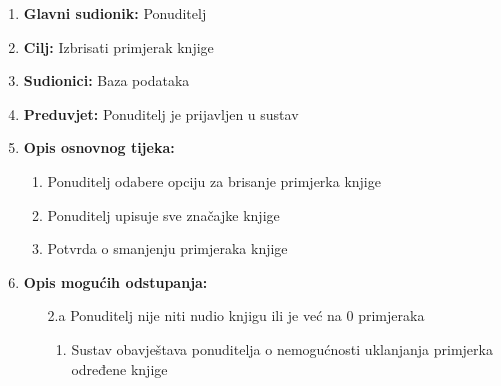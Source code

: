 \documentclass[12pt]{report}
\begin{document}
\noindent {}
\begin{enumerate}
	
	\item \textbf{Glavni sudionik: } Ponuditelj
	\item  \textbf{Cilj:} Izbrisati primjerak knjige
	\item  \textbf{Sudionici:} Baza podataka
	\item  \textbf{Preduvjet:} Ponuditelj je prijavljen u sustav
	\item  \textbf{Opis osnovnog tijeka:}
	
	\begin{enumerate}
		
		\item Ponuditelj odabere opciju za brisanje primjerka knjige
		\item Ponuditelj upisuje sve značajke knjige 
		\item Potvrda o smanjenju primjeraka knjige 
		
	\end{enumerate}
	
	\item  \textbf{Opis mogućih odstupanja:}
	
	\item[] \begin{enumerate}
		
		\item[2.a] Ponuditelj nije niti nudio knjigu ili je već na 0 primjeraka 
		\item[] \begin{enumerate}
			
			\item Sustav obavještava ponuditelja o nemogućnosti uklanjanja primjerka određene knjige
			
		\end{enumerate}
		
	\end{enumerate}
	
\end{enumerate}
\end{document}
